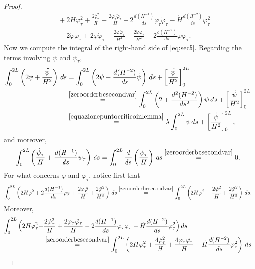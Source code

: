 \documentclass[11pt]{amsart}
\theoremstyle{definition}
\theoremstyle{remark}
\numberwithin{equation}{section}
\begin{document}
\begin{proof}
\begin{equation}
\begin{split}
		&\quad+2H\varphi_\tau^2+\frac{2\dot\varphi_\tau^2}{H}+\frac{2\varphi_\tau\ddot\varphi_\tau}{H}-2\frac{d(H^{-1})}{ds}\varphi_\tau\dot\varphi_\tau-\dot H\frac{d(H^{-2})}{ds}\varphi_\tau^2\\
		&\quad-2\dot\varphi\varphi_\tau+2\varphi\dot\varphi_\tau-\frac{2\dot\varphi\ddot\varphi_\tau}{H^2}-\frac{2\ddot\varphi\dot\varphi_\tau}{H^2}+2\frac{d(H^{-2})}{ds}\ddot\varphi\varphi_\tau.
	\end{split}
\end{equation}
Now we compute the integral of the right-hand side of \eqref{eq:sec5}. Regarding the terms involving $\psi$ and $\psi_\tau$,
\begin{equation}\label{eq:term1}
	\begin{split}
		\int_0^{2L}\left(2\psi+\frac{\ddot\psi}{H^2}\right)\,ds&=\int_0^{2L}\left(2\psi-\frac{d(H^{-2})}{ds}\dot\psi\right)\,ds+\left[\frac{\dot\psi}{H^2}\right]_0^{2L}\\
		&\overset{\eqref{zeroorderbcsecondvar}}{=}\int_0^{2L}\left(2+\frac{d^2(H^{-2})}{ds^2}\right)\psi\,ds+\left[\frac{\dot\psi}{H^2}\right]_0^{2L}\\
		&\overset{\eqref{equazionepuntocriticoinlemma}}{=}\lambda\int_0^{2L}\psi\,ds+\left[\frac{\dot\psi}{H^2}\right]_0^{2L},
	\end{split}
\end{equation}
and moreover,
\begin{equation}\label{eq:term2}
	\int_{0}^{2L}\left(\frac{\dot\psi_\tau}{H}+\frac{d(H^{-1})}{ds}\psi_\tau\right)\,ds=\int_0^{2L}\frac{d}{ds}\left(\frac{\psi_\tau}{H}\right)\,ds\overset{\eqref{zeroorderbcsecondvar}}{=}0.
\end{equation}
For what concerns $\varphi$ and $\varphi_\tau$, notice first that
\begin{equation}\label{eq:term3}
	\int_{0}^{2L}\left(2H\varphi^2+2\frac{d(H^{-1})}{ds}\varphi\dot\varphi+\frac{2\varphi\ddot\varphi}{H}+\frac{2\ddot\varphi^2}{H^3}\right)\,ds\overset{\eqref{zeroorderbcsecondvar}}{=}\int_0^{2L}\left(2H\varphi^2-\frac{2\dot\varphi^2}{H}+\frac{2\ddot\varphi^2}{H^3}\right)\,ds.
\end{equation}
Moreover, 
\begin{equation}\label{eq:term4}
	\begin{split}
		\int_{0}^{2L}\Big(2H\varphi_\tau^2+&\frac{2\dot\varphi_\tau^2}{H}+\frac{2\varphi_\tau\ddot\varphi_\tau}{H}-2\frac{d(H^{-1})}{ds}\varphi_\tau\dot\varphi_\tau-\dot H\frac{d(H^{-2})}{ds}\varphi_\tau^2\Big)\,ds\\
		&\overset{\eqref{zeroorderbcsecondvar}}{=}\int_{0}^{2L}\left(2H\varphi_\tau^2+\frac{4\dot\varphi_\tau^2}{H}+\frac{4\varphi_\tau\ddot\varphi_\tau}{H}-\dot H\frac{d(H^{-2})}{ds}\varphi_\tau^2\right)\,ds\\

\end{split}
\end{equation}
\end{proof}
\end{document}
